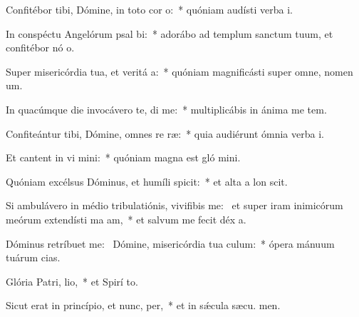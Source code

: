 \item Confitébor tibi, Dómine, in toto cor o:~* quóniam audísti verba  i.
\item In conspéctu Angelórum psal bi:~* adorábo ad templum sanctum tuum, et confitébor nó o.
\item Super misericórdia tua, et veritá a:~* quóniam magnificásti super omne, nomen  um.
\item In quacúmque die invocávero te, di me:~* multiplicábis in ánima me tem.
\item Confiteántur tibi, Dómine, omnes re ræ:~* quia audiérunt ómnia verba  i.
\item Et cantent in vi mini:~* quóniam magna est gló mini.
\item Quóniam excélsus Dóminus, et humíli spicit:~* et alta a lon scit.
\item Si ambulávero in médio tribulatiónis, vivifibis me:~\pscross{} et super iram inimicórum meórum extendísti ma am,~* et salvum me fecit déx a.
\item Dóminus retríbuet  me:~\pscross{} Dómine, misericórdia tua  culum:~* ópera mánuum tuárum  cias.
\item Glória Patri,  lio,~* et Spirí to.
\item Sicut erat in princípio, et nunc,  per,~* et in sǽcula sæcu. men.
